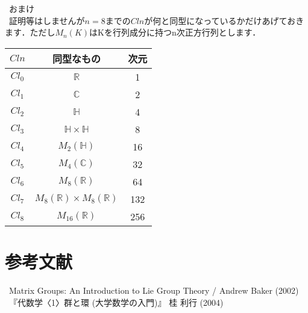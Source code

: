 \documentclass[./main]{subfiles} %
\theoremstyle{idefinition}
\begin{document}
\ おまけ\\
\ 証明等はしませんが$n=8$までの$Cln$が何と同型になっているかだけあげておきます．ただし$M_n(K)$はKを行列成分に持つn次正方行列とします．\\
\begin{center}
\begin{tabular}{|c|c|c|}\hline
$Cln$ & 同型なもの & 次元 \\\hline
$Cl_0$ & $\mathbb{R}$ & 1 \\\hline
$Cl_1$ & $\mathbb{C}$ & 2 \\\hline
$Cl_2$ & $\mathbb{H}$ & 4 \\\hline
$Cl_3$ & $\mathbb{H}\times \mathbb{H}$ & 8 \\\hline
$Cl_4$ & $M_2(\mathbb{H})$ & 16 \\\hline
$Cl_5$ & $M_4(\mathbb{C})$ & 32 \\\hline
$Cl_6$ & $M_8(\mathbb{R})$ & 64 \\\hline
$Cl_7$ & $M_8(\mathbb{R}) \times M_8(\mathbb{R})$ & 132 \\\hline
$Cl_8$ & $M_16(\mathbb{R})$ & 256 \\\hline
\end{tabular}
\end{center}


\section{参考文献}
\ Matrix Groups: An Introduction to Lie Group Theory / Andrew Baker (2002) \\
\ 『代数学〈1〉群と環 (大学数学の入門)』  桂 利行 (2004)
\end{document}
